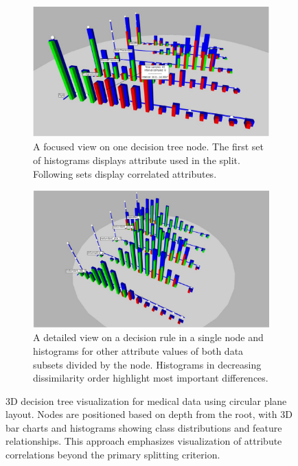\begin{figure}
  \begin{subfigure}[c]{0.48\textwidth}
    \centering
    \includegraphics[width=\linewidth]{images/3D Decision Tree2.png} 
    \caption{A focused view on one decision tree node. The first set of histograms
displays attribute used in the split. Following sets display correlated attributes.}
    \label{fig:bottom-left}
  \end{subfigure}
  \hfill
  \begin{subfigure}[c]{0.48\textwidth}
    \centering
    \includegraphics[width=\linewidth]{images/3D Decision Tree3.png}
    \caption{A detailed view on a decision rule in a single node and histograms for
other attribute values of both data subsets divided by the node. Histograms in
decreasing dissimilarity order highlight most important differences. }
    \label{fig:bottom-right}
  \end{subfigure}

    \caption{3D decision tree visualization for medical data using circular plane layout. Nodes are positioned based on depth from the root, with 3D bar charts and histograms showing class distributions and feature relationships. This approach emphasizes visualization of attribute correlations beyond the primary splitting criterion.}
    \label{fig:3d_medical_trees}
\end{figure}

